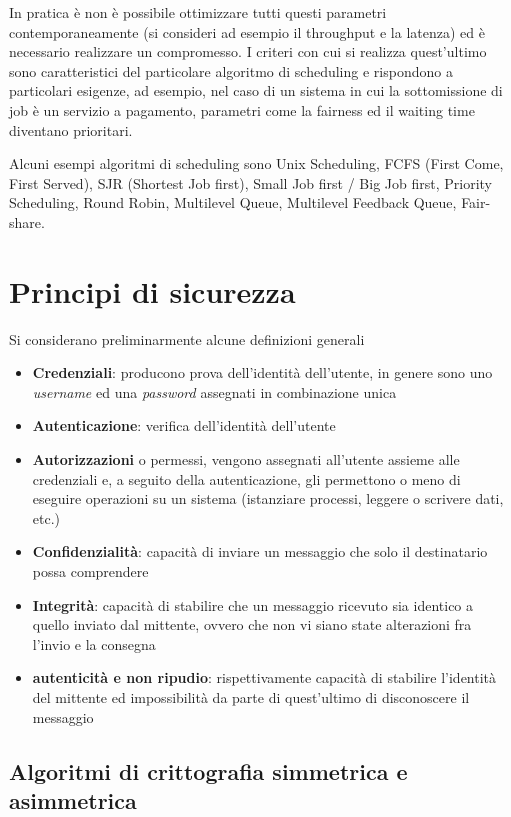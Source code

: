 \documentclass[italian,]{article}
\providecommand{\tightlist}{%
  \setlength{\itemsep}{0pt}\setlength{\parskip}{0pt}}
\begin{document}
In pratica è non è possibile ottimizzare tutti questi parametri
contemporaneamente (si consideri ad esempio il throughput e la latenza)
ed è necessario realizzare un compromesso. I criteri con cui si realizza
quest'ultimo sono caratteristici del particolare algoritmo di scheduling
e rispondono a particolari esigenze, ad esempio, nel caso di un sistema
in cui la sottomissione di job è un servizio a pagamento, parametri come
la fairness ed il waiting time diventano prioritari.

Alcuni esempi algoritmi di scheduling sono Unix Scheduling, FCFS (First
Come, First Served), SJR (Shortest Job first), Small Job first / Big Job
first, Priority Scheduling, Round Robin, Multilevel Queue, Multilevel
Feedback Queue, Fair-share.

\section{Principi di sicurezza}\label{principi-di-sicurezza}

Si considerano preliminarmente alcune definizioni generali

\begin{itemize}
\tightlist
\item
  \textbf{Credenziali}: producono prova dell'identità dell'utente, in
  genere sono uno \emph{username} ed una \emph{password} assegnati in
  combinazione unica
\item
  \textbf{Autenticazione}: verifica dell'identità dell'utente
\item
  \textbf{Autorizzazioni} o permessi, vengono assegnati all'utente
  assieme alle credenziali e, a seguito della autenticazione, gli
  permettono o meno di eseguire operazioni su un sistema (istanziare
  processi, leggere o scrivere dati, etc.)
\item
  \textbf{Confidenzialità}: capacità di inviare un messaggio che solo il
  destinatario possa comprendere
\item
  \textbf{Integrità}: capacità di stabilire che un messaggio ricevuto
  sia identico a quello inviato dal mittente, ovvero che non vi siano
  state alterazioni fra l'invio e la consegna
\item
  \textbf{autenticità e non ripudio}: rispettivamente capacità di
  stabilire l'identità del mittente ed impossibilità da parte di
  quest'ultimo di disconoscere il messaggio
\end{itemize}

\subsection{Algoritmi di crittografia simmetrica e
asimmetrica}\label{algoritmi-di-crittografia-simmetrica-e-asimmetrica}
\end{document}
